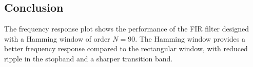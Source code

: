 \subsection*{Conclusion}
The frequency response plot shows the performance of the FIR filter designed with a Hamming window of order \( N = 90 \). The Hamming window provides a better frequency response compared to the rectangular window, with reduced ripple in the stopband and a sharper transition band.
